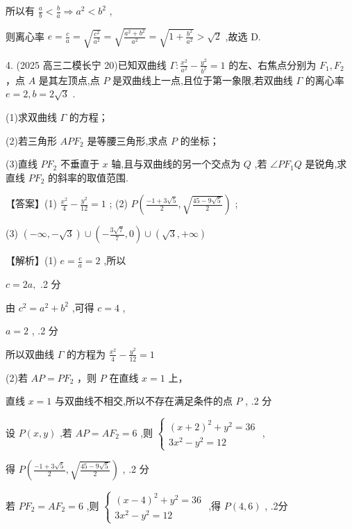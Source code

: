 \documentclass[10pt]{article}
\begin{document}
所以有 \(\frac{a}{b} < \frac{b}{a} \Rightarrow  {a}^{2} < {b}^{2}\) ,

则离心率 \(e = \frac{c}{a} = \sqrt{\frac{{c}^{2}}{{a}^{2}}} = \sqrt{\frac{{a}^{2} + {b}^{2}}{{a}^{2}}} = \sqrt{1 + \frac{{b}^{2}}{{a}^{2}}} > \sqrt{2}\) ,故选 D.

4. (2025 高三二模长宁 20)已知双曲线 \(\Gamma  : \frac{{x}^{2}}{{a}^{2}} - \frac{{y}^{2}}{{b}^{2}} = 1\) 的左、右焦点分别为 \({F}_{1},{F}_{2}\) ，点 \(A\) 是其左顶点,点 \(P\) 是双曲线上一点,且位于第一象限,若双曲线 \(\Gamma\) 的离心率 \(e = 2,b = 2\sqrt{3}\) .

(1)求双曲线 \(\Gamma\) 的方程；

(2)若三角形 \({AP}{F}_{2}\) 是等腰三角形,求点 \(P\) 的坐标；

(3)直线 \(P{F}_{2}\) 不垂直于 \(x\) 轴,且与双曲线的另一个交点为 \(Q\) ,若 \(\angle P{F}_{1}Q\) 是锐角,求直线 \(P{F}_{2}\) 的斜率的取值范围.

【答案】(1) \(\frac{{x}^{2}}{4} - \frac{{y}^{2}}{12} = 1\) ; (2) \(P\left( {\frac{-1 + 3\sqrt{5}}{2},\sqrt{\frac{{45} - 9\sqrt{5}}{2}}}\right)\) ;

(3) \(\left( {-\infty , - \sqrt{3}}\right)  \cup  \left( {-\frac{3\sqrt{7}}{7},0}\right)  \cup  \left( {\sqrt{3}, + \infty }\right)\)

【解析】(1) \(e = \frac{c}{a} = 2\) ,所以

\(c = {2a},\) .2 分

由 \({c}^{2} = {a}^{2} + {b}^{2}\) ,可得 \(c = 4\) ,

\(a = 2\) , .2 分

所以双曲线 \(\Gamma\) 的方程为 \(\frac{{x}^{2}}{4} - \frac{{y}^{2}}{12} = 1\)

(2)若 \({AP} = {P{F}_{2}}\) ，则 \(P\) 在直线 \(x = 1\) 上，

直线 \(x = 1\) 与双曲线不相交,所以不存在满足条件的点 \(P\) , .2 分

设 \(P\left( {x,y}\right)\) ,若 \({AP} = A{F}_{2} = 6\) ,则 \(\left\{  \begin{array}{l} {\left( x + 2\right) }^{2} + {y}^{2} = {36} \\  3{x}^{2} - {y}^{2} = {12} \end{array}\right.\) ,

得 \(P\left( {\frac{-1 + 3\sqrt{5}}{2},\sqrt{\frac{{45} - 9\sqrt{5}}{2}}}\right)\) , .2 分

若 \(P{F}_{2} = A{F}_{2} = 6\) ,则 \(\left\{  \begin{array}{l} {\left( x - 4\right) }^{2} + {y}^{2} = {36} \\  3{x}^{2} - {y}^{2} = {12} \end{array}\right.\) ,得 \(P\left( {4,6}\right)\) , .2分
\end{document}
